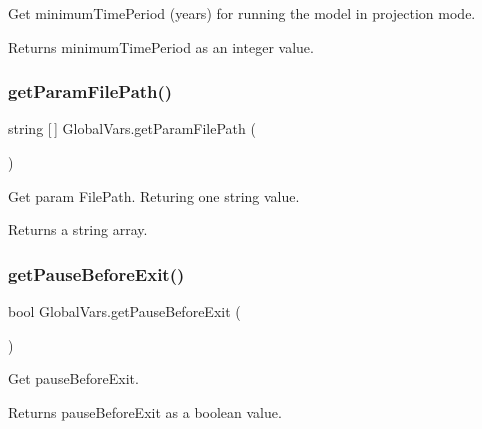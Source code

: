 Get minimum\+Time\+Period (years) for running the model in projection mode. 

\begin{DoxyReturn}{Returns}
minimum\+Time\+Period as an integer value. 
\end{DoxyReturn}
\mbox{\label{class_global_vars_a07f6f253145eaf5be0d60004cc5eddaa}} 
\subsubsection{\texorpdfstring{getParamFilePath()}{getParamFilePath()}}
{\footnotesize\ttfamily string \mbox{[}$\,$\mbox{]} Global\+Vars.\+get\+Param\+File\+Path (\begin{DoxyParamCaption}{ }\end{DoxyParamCaption})\hspace{0.3cm}{\ttfamily [inline]}}



Get param File\+Path. Returing one string value. 

\begin{DoxyReturn}{Returns}
a string array. 
\end{DoxyReturn}
\mbox{\label{class_global_vars_a120f63405f7efd3dd9f062d9abee01e6}} 
\subsubsection{\texorpdfstring{getPauseBeforeExit()}{getPauseBeforeExit()}}
{\footnotesize\ttfamily bool Global\+Vars.\+get\+Pause\+Before\+Exit (\begin{DoxyParamCaption}{ }\end{DoxyParamCaption})\hspace{0.3cm}{\ttfamily [inline]}}



Get pause\+Before\+Exit. 

\begin{DoxyReturn}{Returns}
pause\+Before\+Exit as a boolean value. 
\end{DoxyReturn}
\mbox{\label{class_global_vars_a97b9869100615c2e3b3fc5c48e10080f}} 
